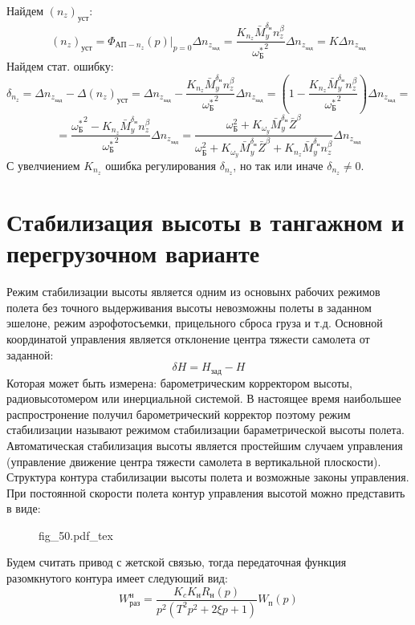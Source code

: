 \documentclass{article}
\newcommand{\incfig}[1]{
    {#1.pdf_tex}
}
\begin{document}
Найдем $(n_z)_\text{уст}$:
\[
	(n_z)_\text{уст} = \Phi_{\text{АП}-n_z}(p) |_{p=0} \Delta n_{z_\text{зад}} =\frac{K_{n_z} \bar{M}_y^{\delta_\text{н}} n_z^\beta}{{\omega_\text{Б}^*}^2} \Delta n_{z_\text{зад}} = K \Delta n_{z_\text{зад}}
\]
Найдем стат. ошибку:
\[
	\delta_{n_z} = \Delta n_{z_\text{зад}} - \Delta (n_z)_\text{уст} = \Delta n_{z_\text{зад}} - \frac{K_{n_z} \bar{M}_y^{\delta_\text{н}}n_z^\beta}{{\omega_\text{Б}^*}^2} \Delta n_{z_\text{зад}} = \left( 1 - \frac{ K_{n_z} \bar{M}_y^{\delta_\text{н}} n_z^\beta}{{\omega_\text{Б}^*}^2} \right) \Delta n_{z_\text{зад}} = 
\]
\[
	= \frac{{\omega_\text{Б}^*}^2 - K_{n_z} \bar{M}_y^{\delta_\text{н}} n_z^\beta}{ {\omega_\text{Б}^*}^2} \Delta n_{z_\text{зад}} = \frac{\omega_\text{Б}^2 + K_{\omega_y} \bar{M}_y^{\delta_\text{н}} \bar{Z}^\beta}{\omega_\text{Б}^2 + K_{\omega_y} \bar{M}_y^{\delta_\text{н}} \bar{Z}^\beta + K_{n_z} \bar{M}_y^{\delta_\text{н}} n_z^\beta} \Delta n_{z_\text{зад}}
\]
С увелчиением $K_{n_z}$ ошибка регулирования $\delta_{n_z}$, но так или иначе $\delta_{n_z} \neq 0$.

\section{Стабилизация высоты в тангажном и перегрузочном варианте}
Режим стабилизации высоты является одним из основынх рабочих режимов полета без точного выдерживания высоты невозможны полеты в заданном эшелоне, режим аэрофотосъемки, прицельного сброса груза и т.д. Основной координатой управления является отклонение центра тяжести самолета от заданной:
\[
	\delta H = H_\text{зад} - H
\]
Которая может быть измерена: барометрическим корректором высоты, радиовысотомером или инерциальной системой. В настоящее время наибольшее распростронение получил барометрический корректор поэтому режим стабилизации называют режимом стабилизации бараметрической высоты полета. Автоматическая стабилизация высоты является простейшим случаем управления (управление движение центра тяжести самолета в вертикальной плоскости). Структура контура стабилизации высоты полета и возможные законы управления. При постоянной скорости полета контур управления высотой можно представить в виде:

\begin{figure}[H]
	\centering
	\incfig{fig_50}
	\label{fig:fig_50}
\end{figure}

Будем считать привод с жетской связью, тогда передаточная функция разомкнутого контура имеет следующий вид:
\[
	W_\text{раз}^\text{н} =\frac{K_c K_\text{н} R_\text{н}(p)}{p^2(T^2 p^2 + 2 \xi p + 1)}W_\text{п}(p)
\]
\end{document}
